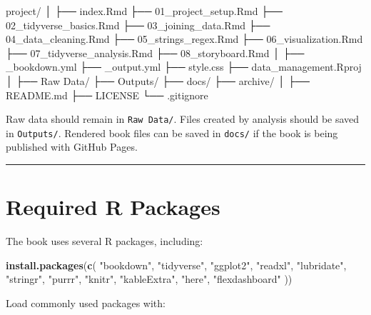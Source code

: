 \documentclass[
  11pt,
  oneside]{book}
\newenvironment{Shaded}{\begin{snugshade}}{\end{snugshade}}
\newcommand{\FunctionTok}[1]{\textcolor[rgb]{0.13,0.29,0.53}{\textbf{#1}}}
\newcommand{\NormalTok}[1]{#1}
\newcommand{\StringTok}[1]{\textcolor[rgb]{0.31,0.60,0.02}{#1}}
\begin{document}
\begin{Shaded}
\begin{Highlighting}[]
\NormalTok{project/}
\NormalTok{│}
\NormalTok{├── index.Rmd}
\NormalTok{├── 01\_project\_setup.Rmd}
\NormalTok{├── 02\_tidyverse\_basics.Rmd}
\NormalTok{├── 03\_joining\_data.Rmd}
\NormalTok{├── 04\_data\_cleaning.Rmd}
\NormalTok{├── 05\_strings\_regex.Rmd}
\NormalTok{├── 06\_visualization.Rmd}
\NormalTok{├── 07\_tidyverse\_analysis.Rmd}
\NormalTok{├── 08\_storyboard.Rmd}
\NormalTok{│}
\NormalTok{├── \_bookdown.yml}
\NormalTok{├── \_output.yml}
\NormalTok{├── style.css}
\NormalTok{├── data\_management.Rproj}
\NormalTok{│}
\NormalTok{├── Raw Data/}
\NormalTok{├── Outputs/}
\NormalTok{├── docs/}
\NormalTok{├── archive/}
\NormalTok{│}
\NormalTok{├── README.md}
\NormalTok{├── LICENSE}
\NormalTok{└── .gitignore}
\end{Highlighting}
\end{Shaded}

Raw data should remain in \texttt{Raw\ Data/}. Files created by analysis should be saved in \texttt{Outputs/}. Rendered book files can be saved in \texttt{docs/} if the book is being published with GitHub Pages.

\begin{center}\rule{0.5\linewidth}{0.5pt}\end{center}

\chapter*{Required R Packages}\label{required-r-packages}

The book uses several R packages, including:

\begin{Shaded}
\begin{Highlighting}[]
\FunctionTok{install.packages}\NormalTok{(}\FunctionTok{c}\NormalTok{(}
  \StringTok{"bookdown"}\NormalTok{,}
  \StringTok{"tidyverse"}\NormalTok{,}
  \StringTok{"ggplot2"}\NormalTok{,}
  \StringTok{"readxl"}\NormalTok{,}
  \StringTok{"lubridate"}\NormalTok{,}
  \StringTok{"stringr"}\NormalTok{,}
  \StringTok{"purrr"}\NormalTok{,}
  \StringTok{"knitr"}\NormalTok{,}
  \StringTok{"kableExtra"}\NormalTok{,}
  \StringTok{"here"}\NormalTok{,}
  \StringTok{"flexdashboard"}
\NormalTok{))}
\end{Highlighting}
\end{Shaded}

Load commonly used packages with:
\end{document}
